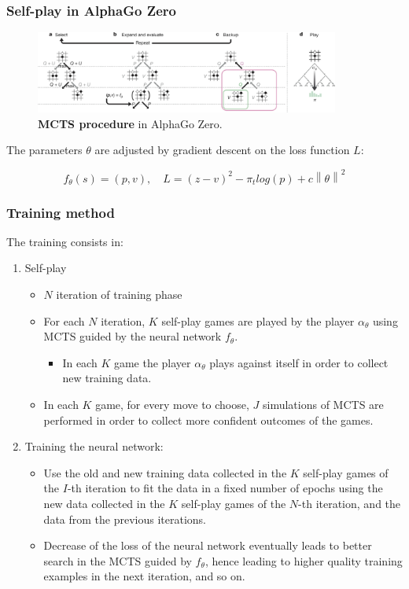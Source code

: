 \documentclass[9pt]{beamer}
\newcommand{\norm}[1]{\left\lVert#1\right\rVert}
\begin{document}
\begin{frame}
	\frametitle{Self-play in AlphaGo Zero}
	
	\begin{figure}[H]
		\centering
		\includegraphics[width=10cm]{alpha-zero-mcts.png}
		\caption{\textbf{MCTS procedure} in AlphaGo Zero.\cite{Silver_2016}}
		\label{fig:alpha-zero-mcts}
	\end{figure}
	
	The parameters $\theta$ are adjusted by gradient descent on the loss function $L$:

	\begin{equation}
		f_\theta(s) = (p,v),\quad L = (z-v)^2 - \pi_t log(p) + c \norm{\theta}^2
	\end{equation}

\end{frame}

\begin{frame}
	\frametitle{Training method}

	The training consists in:
	\begin{enumerate}
		\item Self-play
		\begin{itemize}
			\item $N$ iteration of training phase
			\item For each $N$ iteration, $K$ self-play games are played by the player $\alpha_\theta$ using MCTS guided by the neural network $f_\theta$.
			\begin{itemize}
				\item In each $K$ game the player $\alpha_\theta$ plays against itself in order to collect new training data.
			\end{itemize}
			\item In each $K$ game, for every move to choose, $J$ simulations of MCTS are performed in order to collect more confident outcomes of the games.
		\end{itemize}
		
		\item Training the neural network:
		\begin{itemize}
			\item Use the old and new training data collected in the $K$ self-play games of the $I$-th iteration to fit the data in a fixed number of epochs using the new data collected in the $K$ self-play games of the $N$-th iteration, and the data from the previous iterations.
			\item Decrease of the loss of the neural network eventually leads to better search in the MCTS guided by $f_\theta$, hence leading to higher quality training examples in the next iteration, and so on.
		\end{itemize}		
	\end{enumerate}

\end{frame}
\end{document}
